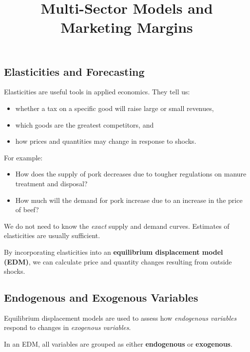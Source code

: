 \documentclass[
  letterpaper,
  DIV=11,
  numbers=noendperiod]{scrartcl}
\title{Multi-Sector Models and Marketing Margins}
\author{}
\date{}
\providecommand{\tightlist}{%
  \setlength{\itemsep}{0pt}\setlength{\parskip}{0pt}}
\begin{document}
\maketitle


\subsection{Elasticities and
Forecasting}\label{elasticities-and-forecasting}

Elasticities are useful tools in applied economics. They tell us:

\begin{itemize}
\tightlist
\item
  whether a tax on a specific good will raise large or small revenues,\\
\item
  which goods are the greatest competitors, and\\
\item
  how prices and quantities may change in response to shocks.
\end{itemize}

For example:

\begin{itemize}
\tightlist
\item
  How does the supply of pork decreases due to tougher regulations on
  manure treatment and disposal?\\
\item
  How much will the demand for pork increase due to an increase in the
  price of beef?
\end{itemize}

We do not need to know the \emph{exact} supply and demand curves.
Estimates of elasticities are usually sufficient.

By incorporating elasticities into an \textbf{equilibrium displacement
model (EDM)}, we can calculate price and quantity changes resulting from
outside shocks.

\subsection{Endogenous and Exogenous
Variables}\label{endogenous-and-exogenous-variables}

Equilibrium displacement models are used to assess how \emph{endogenous
variables} respond to changes in \emph{exogenous variables}.

In an EDM, all variables are grouped as either \textbf{endogenous} or
\textbf{exogenous}.
\end{document}
